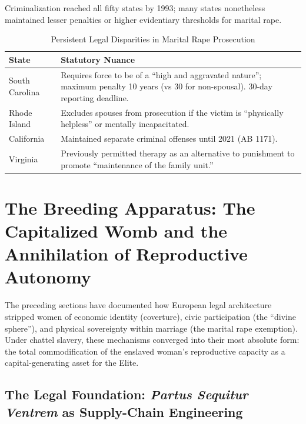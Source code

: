 Criminalization reached all fifty states by 1993; many states nonetheless maintained lesser penalties or higher evidentiary thresholds for marital rape.

\begin{table}[htbp]
\centering
\small
\caption{Persistent Legal Disparities in Marital Rape Prosecution}
\label{tab:marital_rape}
\begin{tabular}{>{\raggedright}p{3cm} >{\raggedright\arraybackslash}p{9cm}}
\toprule
\textbf{State} & \textbf{Statutory Nuance} \\
\midrule
South Carolina & Requires force to be of a ``high and aggravated nature''; maximum penalty 10 years (vs 30 for non-spousal). 30-day reporting deadline. \\
Rhode Island & Excludes spouses from prosecution if the victim is ``physically helpless'' or mentally incapacitated. \\
California & Maintained separate criminal offenses until 2021 (AB 1171). \\
Virginia & Previously permitted therapy as an alternative to punishment to promote ``maintenance of the family unit.'' \\
\bottomrule
\end{tabular}
\end{table}

\section{The Breeding Apparatus: The Capitalized Womb and the Annihilation of Reproductive Autonomy}

The preceding sections have documented how European legal architecture stripped women of economic identity (coverture), civic participation (the ``divine sphere''), and physical sovereignty within marriage (the marital rape exemption). Under chattel slavery, these mechanisms converged into their most absolute form: the total commodification of the enslaved woman's reproductive capacity as a capital-generating asset for the Elite.

\subsection{The Legal Foundation: \textit{Partus Sequitur Ventrem} as Supply-Chain Engineering}

